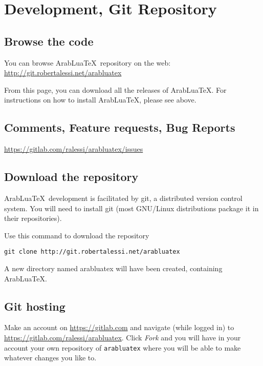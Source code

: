 \documentclass{article}
\begin{document}
\section{Development, Git Repository}
\label{sec:devel-git-repos}
\subsection*{Browse the code}
\label{sec:browse-code}

You can browse ArabLua\TeX\ repository on the web:
\url{http://git.robertalessi.net/arabluatex}

From this page, you can download all the releases of ArabLua\TeX. For
instructions on how to install ArabLua\TeX, please see above.

\subsection*{Comments, Feature requests, Bug Reports}
\label{sec:comm-feat-requ}
\url{https://gitlab.com/ralessi/arabluatex/issues}

\subsection*{Download the repository}
\label{sec:download-repository}
ArabLua\TeX\ development is facilitated by git, a distributed version
control system. You will need to install git (most GNU/Linux
distributions package it in their repositories).

Use this command to download the repository
\begin{verbatim}
git clone http://git.robertalessi.net/arabluatex
\end{verbatim}


A new directory named arabluatex will have been created, containing
ArabLuaTeX.

\subsection*{Git hosting}
\label{sec:git-hosting}
Make an account on \url{https://gitlab.com} and navigate (while
logged in) to \url{https://gitlab.com/ralessi/arabluatex}. Click
\emph{Fork} and you will have in your account your own repository of
\verb|arabluatex| where you will be able to make whatever changes you
like to.
\end{document}
